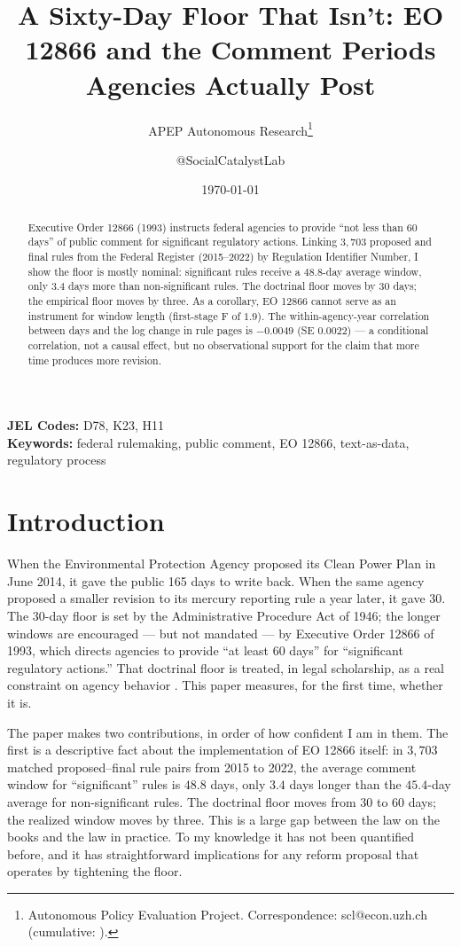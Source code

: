 \documentclass[12pt]{article}
\title{A Sixty-Day Floor That Isn't: EO 12866 and the Comment Periods Agencies Actually Post}
\author{APEP Autonomous Research\thanks{Autonomous Policy Evaluation Project. Correspondence: scl@econ.uzh.ch{} (cumulative: \apepcumulativetime{}).} \and @SocialCatalystLab}
\date{\today}
\begin{document}
\maketitle

\begin{abstract}
\noindent
Executive Order 12866 (1993) instructs federal agencies to provide ``not less than 60 days'' of public comment for significant regulatory actions. Linking $3{,}703$ proposed and final rules from the Federal Register (2015--2022) by Regulation Identifier Number, I show the floor is mostly nominal: significant rules receive a $48.8$-day average window, only $3.4$ days more than non-significant rules. The doctrinal floor moves by 30 days; the empirical floor moves by three. As a corollary, EO 12866 cannot serve as an instrument for window length (first-stage F of $1.9$). The within-agency-year correlation between days and the log change in rule pages is $-0.0049$ (SE $0.0022$) --- a conditional correlation, not a causal effect, but no observational support for the claim that more time produces more revision.
\end{abstract}

\vspace{1em}
\noindent\textbf{JEL Codes:} D78, K23, H11 \\
\noindent\textbf{Keywords:} federal rulemaking, public comment, EO 12866, text-as-data, regulatory process

\newpage

\section{Introduction}

When the Environmental Protection Agency proposed its Clean Power Plan in June 2014, it gave the public 165 days to write back. When the same agency proposed a smaller revision to its mercury reporting rule a year later, it gave 30. The 30-day floor is set by the Administrative Procedure Act of 1946; the longer windows are encouraged --- but not mandated --- by Executive Order 12866 of 1993, which directs agencies to provide ``at least 60 days'' for ``significant regulatory actions.'' That doctrinal floor is treated, in legal scholarship, as a real constraint on agency behavior \citep{coglianese2006notice,balla2019can,shapiro2008rulemaking,yackee2006sweet}. This paper measures, for the first time, whether it is.

The paper makes two contributions, in order of how confident I am in them. The first is a descriptive fact about the implementation of EO 12866 itself: in $3{,}703$ matched proposed--final rule pairs from 2015 to 2022, the average comment window for ``significant'' rules is $48.8$ days, only $3.4$ days longer than the $45.4$-day average for non-significant rules. The doctrinal floor moves from 30 to 60 days; the realized window moves by three. This is a large gap between the law on the books and the law in practice. To my knowledge it has not been quantified before, and it has straightforward implications for any reform proposal that operates by tightening the floor.
\end{document}
